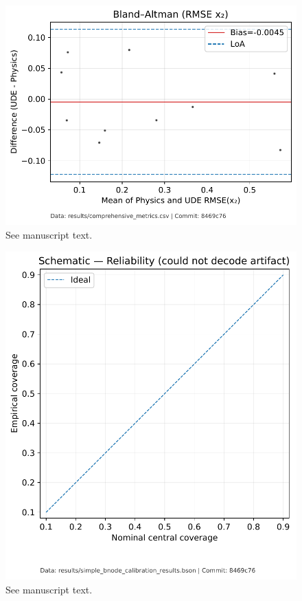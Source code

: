 \begin{figure}[t]
\centering
\includegraphics[width=0.9\linewidth]{paper/figures/fig3_bland_altman_rmse_x2_improved.pdf}
\caption{See manuscript text.}
\end{figure}

\begin{figure}[t]
\centering
\includegraphics[width=0.9\linewidth]{paper/figures/fig6_calibration_bnode_pre_post_improved.pdf}
\caption{See manuscript text.}
\end{figure}

